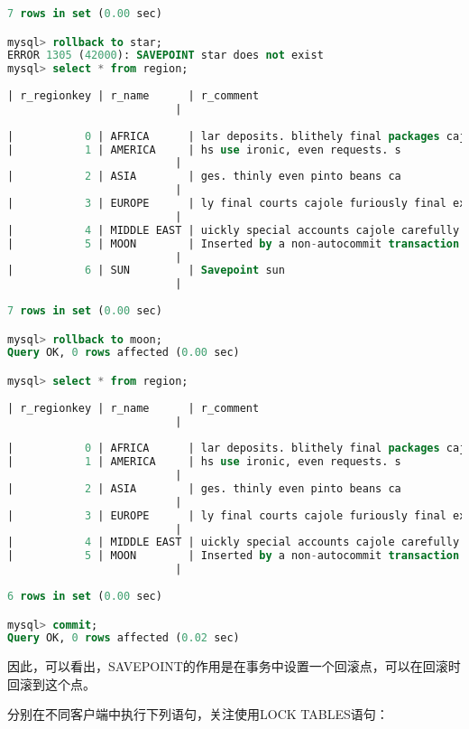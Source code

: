 \documentclass{article}
\begin{document}
\begin{lstlisting}[language=sql]
7 rows in set (0.00 sec)

mysql> rollback to star;
ERROR 1305 (42000): SAVEPOINT star does not exist
mysql> select * from region;
   
| r_regionkey | r_name      | r_comment
                          |
   
|           0 | AFRICA      | lar deposits. blithely final packages cajole. regular waters are final requests. regular accounts are according to  |
|           1 | AMERICA     | hs use ironic, even requests. s
                          |
|           2 | ASIA        | ges. thinly even pinto beans ca
                          |
|           3 | EUROPE      | ly final courts cajole furiously final excuse
                          |
|           4 | MIDDLE EAST | uickly special accounts cajole carefully blithely close requests. carefully final asymptotes haggle furiousl        |
|           5 | MOON        | Inserted by a non-autocommit transaction.
                          |
|           6 | SUN         | Savepoint sun
                          |
   
7 rows in set (0.00 sec)

mysql> rollback to moon;
Query OK, 0 rows affected (0.00 sec)

mysql> select * from region;
   
| r_regionkey | r_name      | r_comment
                          |
   
|           0 | AFRICA      | lar deposits. blithely final packages cajole. regular waters are final requests. regular accounts are according to  |
|           1 | AMERICA     | hs use ironic, even requests. s
                          |
|           2 | ASIA        | ges. thinly even pinto beans ca
                          |
|           3 | EUROPE      | ly final courts cajole furiously final excuse
                          |
|           4 | MIDDLE EAST | uickly special accounts cajole carefully blithely close requests. carefully final asymptotes haggle furiousl        |
|           5 | MOON        | Inserted by a non-autocommit transaction.
                          |
   
6 rows in set (0.00 sec)

mysql> commit;
Query OK, 0 rows affected (0.02 sec)
\end{lstlisting}

因此，可以看出，SAVEPOINT的作用是在事务中设置一个回滚点，可以在回滚时回滚到这个点。

分别在不同客户端中执行下列语句，关注使用LOCK TABLES语句：
\end{document}
